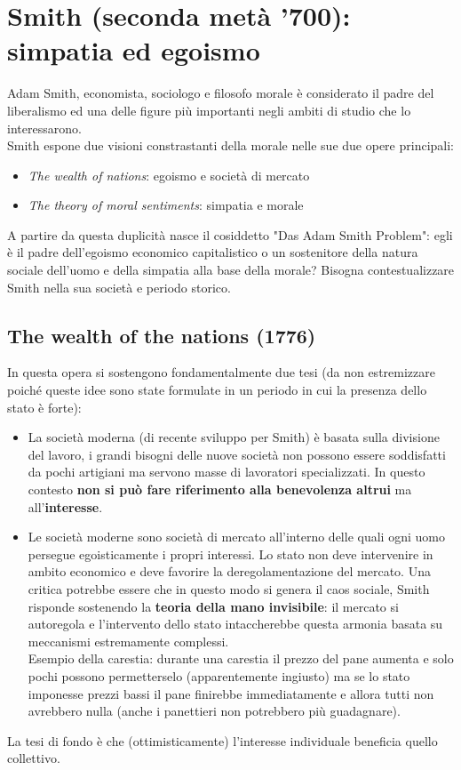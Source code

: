 \documentclass[10pt,a4paper]{article}
\begin{document}
\section{Smith (seconda metà '700): simpatia ed egoismo}
Adam Smith, economista, sociologo e filosofo morale è considerato il padre del liberalismo ed una delle figure più importanti negli ambiti di studio che lo interessarono.\\
Smith espone due visioni constrastanti della morale nelle sue due opere principali:
\begin{itemize}
	\item \textit{The wealth of nations}: egoismo e società di mercato
	\item \textit{The theory of moral sentiments}: simpatia e morale
\end{itemize}
A partire da questa duplicità nasce il cosiddetto "Das Adam Smith Problem": egli è il padre dell'egoismo economico capitalistico o un sostenitore della natura sociale dell'uomo e della simpatia alla base della morale? Bisogna contestualizzare Smith nella sua società e periodo storico.
\subsection{The wealth of the nations (1776)}
In questa opera si sostengono fondamentalmente due tesi (da non estremizzare poiché queste idee sono state formulate in un periodo in cui la presenza dello stato è forte):
\begin{itemize}
	\item La società moderna (di recente sviluppo per Smith) è basata sulla divisione del lavoro, i grandi bisogni delle nuove società non possono essere soddisfatti da pochi artigiani ma servono masse di lavoratori specializzati. In questo contesto \textbf{non si può fare riferimento alla benevolenza altrui} ma all'\textbf{interesse}. 
	\item Le società moderne sono società di mercato all'interno delle quali ogni uomo persegue egoisticamente i propri interessi. Lo stato non deve intervenire in ambito economico e deve favorire la deregolamentazione del mercato. Una critica potrebbe essere che in questo modo si genera il caos sociale, Smith risponde sostenendo la \textbf{teoria della mano invisibile}: il mercato si autoregola e l'intervento dello stato intaccherebbe questa armonia basata su meccanismi estremamente complessi.\\
	Esempio della carestia: durante una carestia il prezzo del pane aumenta e solo pochi possono permetterselo (apparentemente ingiusto) ma se lo stato imponesse prezzi bassi il pane finirebbe immediatamente e allora tutti non avrebbero nulla (anche i panettieri non potrebbero più guadagnare). 
\end{itemize}
La tesi di fondo è che (ottimisticamente) l'interesse individuale beneficia quello collettivo. \\
\end{document}
